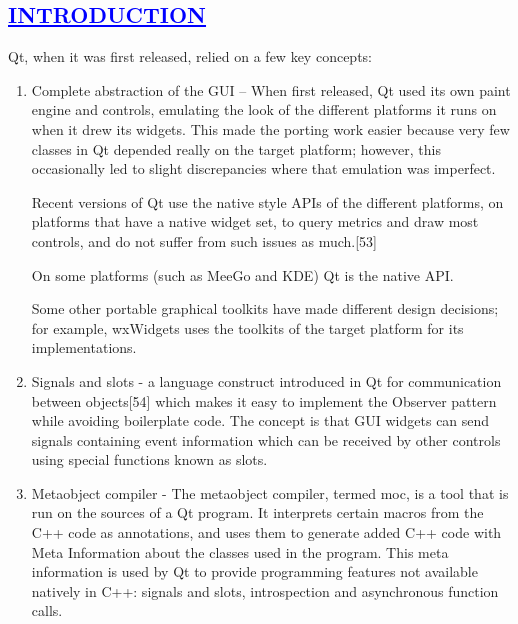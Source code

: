 \documentclass[a4paper,12pt]{report}
\begin{document}
\begin{center}
\chapter{\textcolor{blue}{\underline {INTRODUCTION}}}
\end{center}

\noindent Qt, when it was first released, relied on a few key concepts:
\begin{enumerate}
\item 
    Complete abstraction of the GUI – When first released, Qt used its own paint engine and controls, emulating the look of the different platforms it runs on when it drew its widgets. This made the porting work easier because very few classes in Qt depended really on the target platform; however, this occasionally led to slight discrepancies where that emulation was imperfect.

    Recent versions of Qt use the native style APIs of the different platforms, on platforms that have a native widget set, to query metrics and draw most controls, and do not suffer from such issues as much.[53]

    On some platforms (such as MeeGo and KDE) Qt is the native API.

    Some other portable graphical toolkits have made different design decisions; for example, wxWidgets uses the toolkits of the target platform for its implementations.
\item Signals and slots - a language construct introduced in Qt for communication between objects[54] which makes it easy to implement the Observer pattern while avoiding boilerplate code. The concept is that GUI widgets can send signals containing event information which can be received by other controls using special functions known as slots.
\item Metaobject compiler - The metaobject compiler, termed moc, is a tool that is run on the sources of a Qt program. It interprets certain macros from the C++ code as annotations, and uses them to generate added C++ code with Meta Information about the classes used in the program. This meta information is used by Qt to provide programming features not available natively in C++: signals and slots, introspection and asynchronous function calls.
\end{enumerate}
\end{document}
